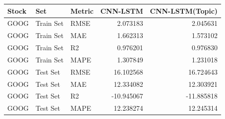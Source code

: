 \begin{tabular}{lllrr}
\toprule
Stock & Set & Metric & CNN-LSTM & CNN-LSTM(Topic) \\
\midrule
GOOG & Train Set & RMSE & 2.073183 & 2.045631 \\
GOOG & Train Set & MAE & 1.662313 & 1.573102 \\
GOOG & Train Set & R2 & 0.976201 & 0.976830 \\
GOOG & Train Set & MAPE & 1.307849 & 1.231018 \\
GOOG & Test Set & RMSE & 16.102568 & 16.724643 \\
GOOG & Test Set & MAE & 12.334082 & 12.303921 \\
GOOG & Test Set & R2 & -10.945067 & -11.885818 \\
GOOG & Test Set & MAPE & 12.238274 & 12.245314 \\
\bottomrule
\end{tabular}
